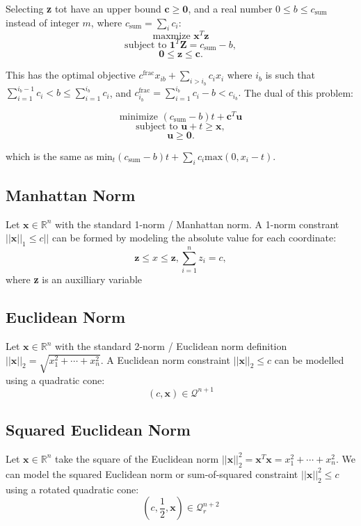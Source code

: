 \documentclass{article}
\begin{document}
Selecting \textbf{z} tot have an upper bound $\mathbf{c}\geq\mathbf{0}$, and a real number
$0\leq b \leq c_\text{sum}$ instead of integer $m$, where $c_\text{sum}=\sum_ic_i$:
$$\text{maxmize } \mathbf{x}^T\mathbf{z}$$
$$\text{subject to } \mathbf{1}^T\mathbf{Z} = c_\text{sum} - b,$$
$$\mathbf{0}\leq\mathbf{z}\leq\mathbf{c}.$$

This has the optimal objective $c^\text{frac}x_{ib} + \sum_{i>i_b}c_ix_i$ where $i_b$ is such that
$\sum_{i=1}^{i_b-1}c_i<b\leq\sum^{i_b}_{i=1}c_i$, and $c_{i_b}^\text{frac}=\sum^{i_b}_{i=1}c_i-b<c_{i_b}.$
The dual of this problem:

$$\text{minimize } (c_\text{sum}-b)t+\mathbf{c}^T\mathbf{u}$$
$$\text{subject to } \mathbf{u}+t\geq\mathbf{x},$$
$$\mathbf{u}\geq\mathbf{0}.$$

which is the same as $\text{min}_t(c_\text{sum}-b)t+\sum_ic_i\text{max}(0,x_i-t)$.

\subsection{Manhattan Norm}
Let $\mathbf{x}\in \mathbb{R}^n$ with the standard 1-norm / Manhattan norm. A
1-norm constrant $||\mathbf{x}||_1\leq c||$ can be formed by modeling the
absolute value for each coordinate:
$$\mathbf{z}\leq x\leq \mathbf{z}, \sum_{i=1}^nz_i=c,$$
where \textbf{z} is an auxilliary variable

\subsection{Euclidean Norm}
Let $\mathbf{x} \in \mathbb{R}^n$ with the standard 2-norm / Euclidean norm
definition $||\mathbf{x}||_2 = \sqrt{x_1^2+\cdots+x_n^2}$. A Euclidean
norm constraint $||\mathbf{x}||_2\leq c$ can be modelled using a quadratic
cone:
$$(c,\mathbf{x}) \in \mathcal{Q}^{n+1}$$

\subsection{Squared Euclidean Norm}
Let $\mathbf{x} \in \mathbb{R}^n$ take the square of the Euclidean norm
$||\mathbf{x}||^2_2=\mathbf{x}^T\mathbf{x}=x_1^2+\cdots+x_n^2$. We can
model the squared Euclidean norm or sum-of-squared constraint
$||\mathbf{x}||_2^2\leq c$ using a rotated quadratic cone:
$$(c,\frac{1}{2},\mathbf{x})\in\mathcal{Q}_r^{n+2}$$
\end{document}
